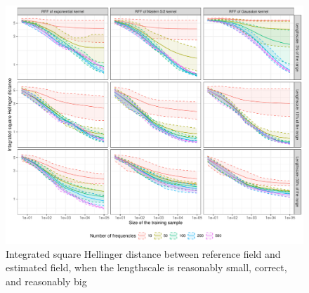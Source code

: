 \documentclass[
]{article}
\begin{document}
\begin{figure}[H]

{\centering \includegraphics{IntroductionSLGP_files/figure-latex/PlotOtherLen-1} 

}

\caption{Integrated square Hellinger distance between reference field and estimated field, when the lengthscale is reasonably small, correct, and reasonably big}\label{fig:PlotOtherLen}
\end{figure}
\end{document}
